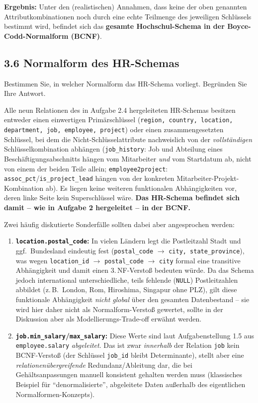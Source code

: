 \documentclass[11pt,a4paper]{article}
\begin{document}
\begin{loesung}
\textbf{Ergebnis:} Unter den (realistischen) Annahmen, dass keine der oben genannten Attributkombinationen noch durch eine echte Teilmenge des jeweiligen Schl\"ussels bestimmt wird, befindet sich das \textbf{gesamte Hochschul-Schema in der Boyce-Codd-Normalform (BCNF)}.
\end{loesung}

\subsection*{3.6 \quad Normalform des HR-Schemas}
Bestimmen Sie, in welcher Normalform das HR-Schema vorliegt. Begr\"unden Sie Ihre Antwort.

\begin{loesung}
Alle neun Relationen des in Aufgabe 2.4 hergeleiteten HR-Schemas besitzen entweder einen einwertigen Prim\"arschl\"ussel (\texttt{region, country, location, department, job, employee, project}) oder einen zusammengesetzten Schl\"ussel, bei dem die Nicht-Schl\"usselattribute nachweislich von der \emph{vollst\"andigen} Schl\"usselkombination abh\"angen (\texttt{job\_history}: Job und Abteilung eines Besch\"aftigungsabschnitts h\"angen vom Mitarbeiter \emph{und} vom Startdatum ab, nicht von einem der beiden Teile allein; \texttt{employee2project}: \texttt{assoc\_pct}/\texttt{is\_project\_lead} h\"angen von der konkreten Mitarbeiter-Projekt-Kombination ab). Es liegen keine weiteren funktionalen Abh\"angigkeiten vor, deren linke Seite kein Superschl\"ussel w\"are. \textbf{Das HR-Schema befindet sich damit -- wie in Aufgabe 2 hergeleitet -- in der BCNF.}

Zwei h\"aufig diskutierte Sonderf\"alle sollten dabei aber angesprochen werden:
\begin{enumerate}
\item \textbf{\texttt{location.postal\_code}:} In vielen L\"andern legt die Postleitzahl Stadt und ggf.\ Bundesland eindeutig fest (\texttt{postal\_code} $\to$ \texttt{city, state\_province}), was wegen \texttt{location\_id} $\to$ \texttt{postal\_code} $\to$ \texttt{city} formal eine transitive Abh\"angigkeit und damit einen 3.\,NF-Versto\ss{} bedeuten w\"urde. Da das Schema jedoch international unterschiedliche, teils fehlende (\texttt{NULL}) Postleitzahlen abbildet (z.\,B.\ London, Rom, Hiroshima, Singapur ohne PLZ), gilt diese funktionale Abh\"angigkeit \emph{nicht global} \"uber den gesamten Datenbestand -- sie wird hier daher nicht als Normalform-Versto\ss{} gewertet, sollte in der Diskussion aber als Modellierungs-Trade-off erw\"ahnt werden.
\item \textbf{\texttt{job.min\_salary}/\texttt{max\_salary}:} Diese Werte sind laut Aufgabenstellung 1.5 aus \texttt{employee.salary} \emph{abgeleitet}. Das ist zwar \emph{innerhalb} der Relation \texttt{job} kein BCNF-Versto\ss{} (der Schl\"ussel \texttt{job\_id} bleibt Determinante), stellt aber eine \emph{relationen\"ubergreifende} Redundanz/Ableitung dar, die bei Geh\"altsanpassungen manuell konsistent gehalten werden muss (klassisches Beispiel f\"ur ``denormalisierte'', abgeleitete Daten au\ss{}erhalb des eigentlichen Normalformen-Konzepts).
\end{enumerate}
\end{loesung}
\end{document}
